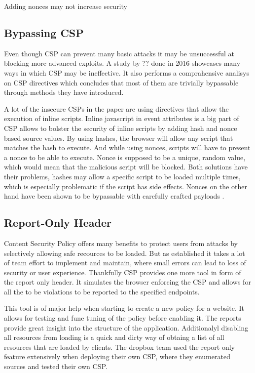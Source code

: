 \documentclass[11]{article}   %
\begin{document}
Adding nonces may not increase security

\subsection{Bypassing CSP}
Even though CSP can prevent many basic attacks it may be unsuccessful at blocking more advanced exploits.
A study by ?? \cite{??} done in 2016 showcases many ways in which CSP may be ineffective. 
It also performs a comprahensive analisys on CSP directives which concludes that most of them are trivially bypassable through methods they have introduced.

A lot of the insecure CSPs in the paper are using directives that allow the execution of inline scripts.
Inline javascript in event attributes is a big part of 
CSP allows to bolster the security of inline scripts by adding hash and nonce based source values.
By using hashes, the browser will allow any script that matches the hash to execute.
And while using nonces, scripts will have to present a nonce to be able to execute. 
Nonce is supposed to be a unique, random value, which would mean that the malicious script will be blocked.
Both solutions have their problems, hashes may allow a specific script to be loaded multiple times, which is especially problematic if the script has side effects.
Nonces on the other hand have been shown to be bypassable with carefully crafted payloads \cite{???}.



\subsection{Report-Only Header}
Content Security Policy offers many benefits to protect users from attacks by selectively allowing safe recources to be loaded.
But as established it takes a lot of team effort to implement and maintain, where small errors can lead to loss of security or user experience.
Thankfully CSP provides one more tool in form of the report only header.
It simulates the browser enforcing the CSP and allows for all the to be violations to be reported to the specified endpoints.

This tool is of major help when starting to create a new policy for a website.
It allows for testing and fune tuning of the policy before enabling it. 
The reports provide great insight into the structure of the application.
Additionalyl disabling all resources from loading is a quick and dirty way of obtaing a list of all resources that are loaded by clients.
The dropbox team used the report only feature extensively when deploying their own CSP, where they enumerated sources and tested their own CSP. 
\end{document}
